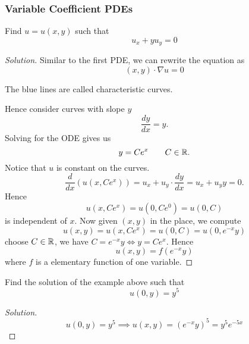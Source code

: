 \subsubsection{Variable Coefficient PDEs}
\begin{example}
	Find $u = u(x,y)$ such that
	\[ u_x + yu_y = 0\]
\end{example}
\begin{proof}[Solution]
	Similar to the first PDE, we can rewrite the equation as
	\[ (x,y) \cdot \nabla u = 0 \]
	\begin{center}

		The blue lines are called characteristic curves.
	\end{center}
	
	Hence consider curves with slope $y$
	\[ \frac{dy}{dx} = y.\]
	Solving for the ODE gives us
	\[ y = Ce^{x} \qquad C \in \mathbb R.\]
	Notice that $u$ is constant on the curves.
	\[ \frac{d}{dx} \left( u \left( x, Ce^{x} \right)  \right) = u_x + u_y \cdot \frac{dy}{dx} = u_x + u_y y = 0. \]
	Hence
	\[ u(x, Ce^x) = u(0, Ce^0) = u(0,C)\]
	is independent of $x$. Now given $(x,y)$ in the place, we compute
	\[ u(x,y) = u(x,Ce^x)  =u(0,C)  = u(0, e^{-x}y)\]
	choose $C \in \mathbb R$, we have $C = e^{-x}y \iff y = Ce^x$. Hence 
	\[ u(x,y) = f(e^{-x}y)\]
	where $f$ is a elementary function of one variable.
\end{proof}
\begin{exercise}
	Find the solution of the example above such that
	\[ u(0,y) = y^5\]
\end{exercise}
\begin{proof}[Solution]
	\[ u(0,y) = y^5 \implies u(x,y) = (e^{-x}y)^5 = y^5 e^{-5x}\]
\end{proof}
